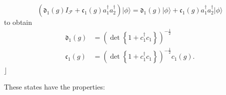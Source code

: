 \documentclass[aps, preprint]{revtex4}
\begin{document}
\begin{equation}\left (\mathfrak{d}_{1} \left (g\right ) I_{\mathcal{F}} +\mathfrak{c}_{1} \left (g\right ) a_{1}^{ \dag } a_{2}^{ \dag }\right )\vert \phi  \rangle  =\mathfrak{d}_{1} \left (g\right ) \vert \phi  \rangle  +\mathfrak{c}_{1} \left (g\right ) a_{1}^{ \dag } a_{2}^{ \dag }\vert \phi  \rangle 
\end{equation}to obtain
\begin{align}\mathfrak{d}_{1} \left (g\right ) &  =\left (\det \left \{1 +c_{1}^{ \dag } c_{1}\right \}\right )^{ -\frac{1}{2}} \\
\mathfrak{c}_{1} \left (g\right ) &  =\left (\det \left \{1 +c_{1}^{ \dag } c_{1}\right \}\right )^{ -\frac{1}{2}} c_{1} \left (g\right )\text{.}\end{align}$\rfloor $ 

These states have the properties: 
\end{document}
